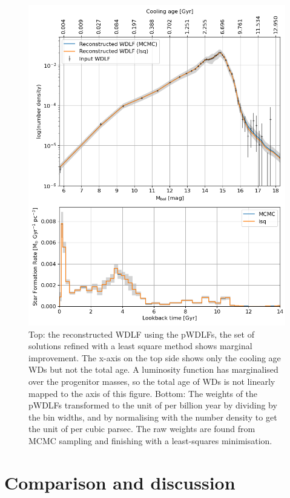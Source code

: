\documentclass[fleqn,usenatbib]{mnras}
\begin{document}
\begin{figure}
    \includegraphics[width=
    \columnwidth]{figures/fig_05_gcns_reconstructed_wdlf_optimal_resolution_bin_optimal.png}
    \caption{Top: the reconstructed WDLF using the pWDLFs, the set of solutions
    refined with a least square method shows marginal improvement. The x-axis on
    the top side shows only the cooling age WDs but not the total age. A
    luminosity function has marginalised over the progenitor masses, so the total
    age of WDs is not linearly mapped to the axis of this figure. Bottom: The
    weights of the pWDLFs transformed to the unit of per billion year by dividing
    by the bin widths, and by normalising with the number density to get the
    unit of per cubic parsec. The raw weights are found from MCMC sampling
    and finishing with a least-squares minimisation.}
    \label{fig:sfh_mag_bin_05}
\end{figure}


\section{Comparison and discussion}
\end{document}
